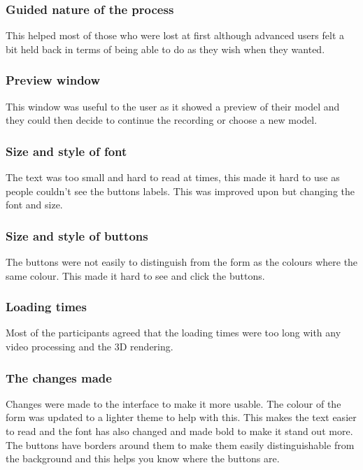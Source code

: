 \subsubsection{Guided nature of the process}
This helped most of those who were lost at first although advanced users felt a bit held back in terms of being able to do as they wish when they wanted.

\subsubsection{Preview window}
This window was useful to the user as it showed a preview of their model and they could then decide to continue the recording or choose a new model.

\subsubsection{Size and style of font}
The text was too small and hard to read at times, this made it hard to use as people couldn't see the buttons labels. This was improved upon but changing the font and size.

\subsubsection{Size and style of buttons}
The buttons were not easily to distinguish from the form as the colours where the same colour. This made it hard to see and click the buttons.

\subsubsection{Loading times}
Most of the participants agreed that the loading times were too long with any video processing and the 3D rendering.

\subsubsection{The changes made}
Changes were made to the interface to make it more usable. The colour of the form was updated to a lighter theme to help with this. This makes the text easier to read and the font has also changed and made bold to make it stand out more. The buttons have borders around them to make them easily distinguishable from the background and this helps you know where the buttons are.
